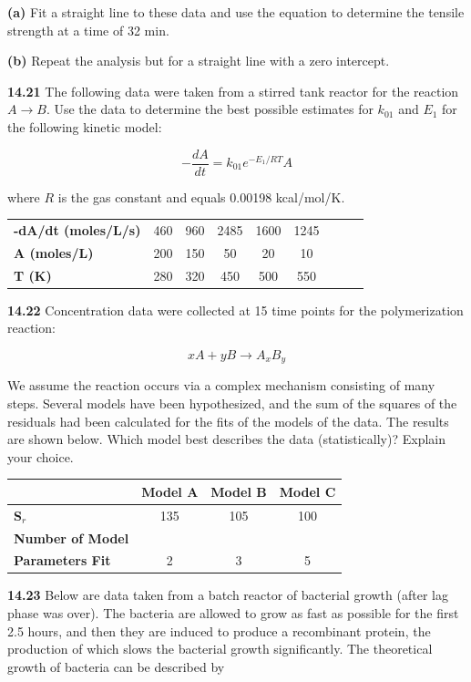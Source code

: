\documentclass[../main.tex]{subfiles}
\begin{document}
\begin{multicols}{2}
	\noindent \textbf{(a)} Fit a straight line to these data and use the equation to
	determine the tensile strength at a time of 32 min.


	\noindent \textbf{(b)} Repeat the analysis but for a straight line with a zero
	intercept.

	\noindent\textbf{14.21}  The following data were taken from a stirred tank reactor for the reaction $A \rightarrow B$. Use the data to determine the
	best possible estimates for $k_{01}$ and $E_1$ for the following
	kinetic model:

	$$- \frac{d A}{d t} = k _{01} e^{-E_1 / RT} A$$

	\noindent where $R$ is the gas constant and equals 0.00198 kcal/mol/K.

	\noindent \begin{tabular}{l c c c c c c c c}
		\textbf{-dA/dt (moles/L/s)} & 460 & 960 & 2485 & 1600 & 1245 \\ 
		\textbf{A (moles/L)} & 200 & 150 & 50 & 20 & 10 \\
		\textbf{T (K)} & 280 & 320 & 450 & 500 & 550
	\end{tabular}

	\noindent\textbf{14.22} Concentration data were collected at 15 time points
	for the polymerization reaction:

	$$x A + y B \rightarrow A_x B_y$$

	\noindent We assume the reaction occurs via a complex mechanism
	consisting of many steps. Several models have been hypothesized, and the sum of the squares of the residuals had been
	calculated for the fits of the models of the data. The results are shown below. Which model best describes the data (statistically)? Explain your choice.


	\noindent \begin{tabular}{l c c c}
		 & \textbf{Model A} & \textbf{Model B} & \textbf{Model C} \\
		\hline
		\textbf{S$_r$} & 135 & 105 & 100 \\
		\textbf{Number of Model} \\
		\textbf{Parameters Fit} & 2 & 3 & 5
  	\end{tabular}

	\noindent\textbf{14.23} Below are data taken from a batch reactor of bacterial
	growth (after lag phase was over). The bacteria are allowed
	to grow as fast as possible for the first 2.5 hours, and then
	they are induced to produce a recombinant protein, the production of which slows the bacterial growth significantly.
	The theoretical growth of bacteria can be described by


\end{multicols}
\end{document}
